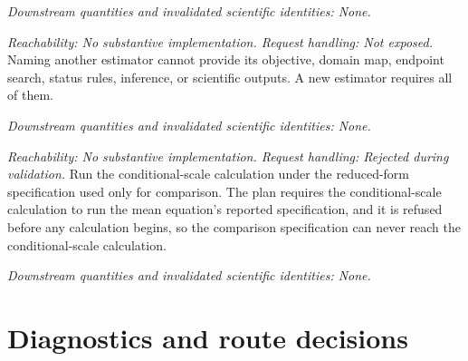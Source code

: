 \documentclass[11pt]{article}
\begin{document}
\begin{description}[style=nextline]
\emph{Downstream quantities and invalidated scientific identities: None.}

\item[Additional conditional-scale estimator.]
\emph{Reachability: No substantive implementation. Request handling: Not exposed.}
Naming another estimator cannot provide its objective, domain map, endpoint search, status rules,
inference, or scientific outputs. A new estimator requires all of them.

\emph{Downstream quantities and invalidated scientific identities: None.}

\item[Conditional-scale calculation under the comparison specification.]
\emph{Reachability: No substantive implementation. Request handling: Rejected during validation.}
Run the conditional-scale calculation under the reduced-form specification used only for comparison. The
plan requires the conditional-scale calculation to run the mean equation's reported specification, and it is
refused before any calculation begins, so the comparison specification can never reach the
conditional-scale calculation.

\emph{Downstream quantities and invalidated scientific identities: None.}
\end{description}

\section{Diagnostics and route decisions}
\end{document}
